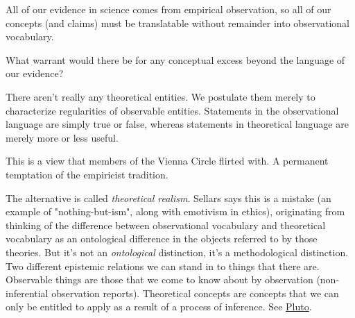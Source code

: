 
All of our evidence in science comes from empirical observation, so all of our concepts (and claims) must be translatable without remainder into observational vocabulary.

What warrant would there be for any conceptual excess beyond the language of our evidence?

There aren't really any theoretical entities. We postulate them merely to characterize regularities of observable entities. Statements in the observational language are simply true or false, whereas statements in theoretical language are merely more or less useful.

This is a view that members of the Vienna Circle flirted with. A permanent temptation of the empiricist tradition.

The alternative is called \emph{theoretical realism}. Sellars says this is a mistake (an example of "nothing-but-ism", along with emotivism in ethics), originating from thinking of the difference between observational vocabulary and theoretical vocabulary as an ontological difference in the objects referred to by those theories. But it's not an \emph{ontological} distinction, it's a methodological distinction. Two different epistemic relations we can stand in to things that there are. Observable things are those that we come to know about by observation (non-inferential observation reports). Theoretical concepts are concepts that we can only be entitled to apply as a result of a process of inference. See \href{doc/phil/Phil Situations/Pluto|Evidence against instrumentalism}{Pluto}.


